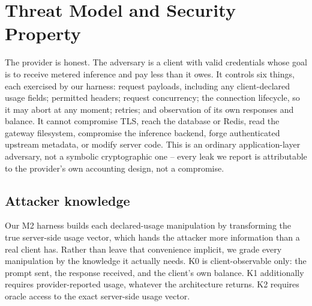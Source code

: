\documentclass[final,5p,times,twocolumn,number]{elsarticle}
\begin{document}
\begin{table}[t]
\caption{Adversary directions in LLM inference accounting. Prior work covers the first
three rows; this paper studies the fourth.}
\label{tab:quadrant}
\centering
{}
\end{table}

\section{Threat Model and Security Property}
\label{sec:threat}
The provider is honest. The adversary is a client with valid credentials whose goal is to
receive metered inference and pay less than it owes. It controls six things, each
exercised by our harness: request payloads, including any client-declared usage fields;
permitted headers; request concurrency; the connection lifecycle, so it may abort at any
moment; retries; and observation of its own responses and balance. It cannot compromise
TLS, reach the database or Redis, read the gateway filesystem, compromise the inference
backend, forge authenticated upstream metadata, or modify server code. This is an
ordinary application-layer adversary, not a symbolic cryptographic one -- every leak we
report is attributable to the provider's own accounting design, not a compromise.

\subsection{Attacker knowledge}
Our M2 harness builds each declared-usage manipulation by transforming the true
server-side usage vector, which hands the attacker more information than a real client
has. Rather than leave that convenience implicit, we grade every manipulation by the
knowledge it actually needs. K0 is client-observable only: the prompt sent, the response
received, and the client's own balance. K1 additionally requires provider-reported usage,
whatever the architecture returns. K2 requires oracle access to the exact server-side
usage vector.
\end{document}
